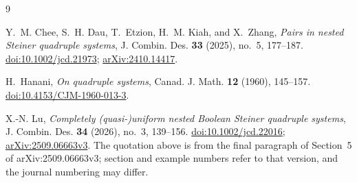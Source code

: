 \documentclass[11pt]{amsart}
\theoremstyle{remark}
\begin{document}
\begin{thebibliography}{9}

Y.~M. Chee, S.~H. Dau, T.~Etzion, H.~M. Kiah, and X.~Zhang,
\emph{Pairs in nested Steiner quadruple systems},
J. Combin. Des. \textbf{33} (2025), no.~5, 177--187.
\href{https://doi.org/10.1002/jcd.21973}{doi:10.1002/jcd.21973};
\href{https://arxiv.org/abs/2410.14417}{arXiv:2410.14417}.

H.~Hanani,
\emph{On quadruple systems},
Canad. J. Math. \textbf{12} (1960), 145--157.
\href{https://doi.org/10.4153/CJM-1960-013-3}{doi:10.4153/CJM-1960-013-3}.

X.-N. Lu,
\emph{Completely (quasi-)uniform nested Boolean Steiner quadruple systems},
J. Combin. Des. \textbf{34} (2026), no.~3, 139--156.
\href{https://doi.org/10.1002/jcd.22016}{doi:10.1002/jcd.22016};
\href{https://arxiv.org/abs/2509.06663v3}{arXiv:2509.06663v3}.
The quotation above is from the final paragraph of Section~5 of
arXiv:2509.06663v3; section and example numbers refer to that version, and the
journal numbering may differ.

\end{thebibliography}
\end{document}
